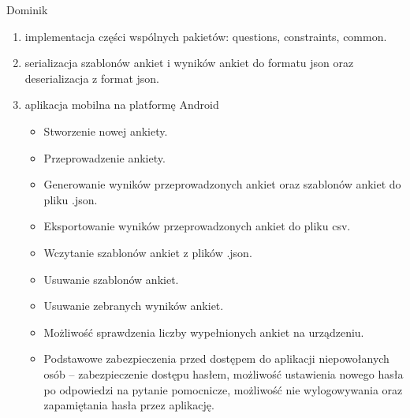 \documentclass[a4paper,10pt]{beamer}
\begin{document}
		\begin{frame}{Dominik}
			\begin{enumerate}
			\item	implementacja części wspólnych pakietów: questions, constraints, common.
			\item	serializacja szablonów ankiet i wyników ankiet do formatu json oraz deserializacja z format json.
			\item	aplikacja mobilna na platformę Android	
				\begin{itemize}
						\item	Stworzenie nowej ankiety.
							\item	Przeprowadzenie ankiety.
							\item	Generowanie wyników przeprowadzonych ankiet oraz szablonów ankiet do pliku .json.
							\item	Eksportowanie wyników przeprowadzonych ankiet do pliku csv.
							\item	Wczytanie szablonów ankiet z plików .json.
							\item	Usuwanie szablonów ankiet.
							\item	Usuwanie zebranych wyników ankiet.
							\item	Możliwość sprawdzenia liczby wypełnionych ankiet na urządzeniu.
							\item	Podstawowe zabezpieczenia przed dostępem do aplikacji niepowołanych osób – zabezpieczenie dostępu hasłem, możliwość ustawienia nowego hasła po odpowiedzi na pytanie pomocnicze, możliwość nie wylogowywania oraz zapamiętania hasła przez aplikację.
				\end{itemize}
			\end{enumerate}
		\end{frame}
\end{document}
